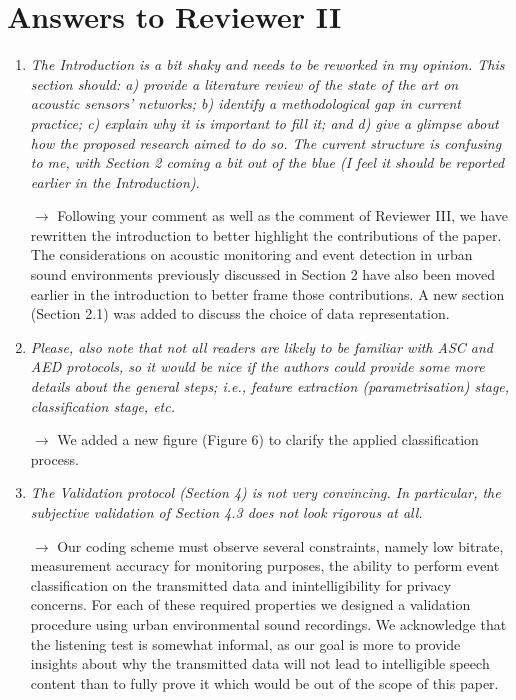 \documentclass[10pt]{article}
\begin{document}
\section{Answers to Reviewer II}

\begin{enumerate}

\item \emph{The Introduction is a bit shaky and needs to be reworked in my opinion. This section should: a) provide a literature review of the state of the art on acoustic sensors’ networks; b) identify a methodological gap in current practice; c) explain why it is important to fill it; and d) give a glimpse about how the proposed research aimed to do so. The current structure is confusing to me, with Section 2 coming a bit out of the blue (I feel it should be reported earlier in the Introduction).}

$\rightarrow$ Following your comment as well as the comment of Reviewer III, we have rewritten the introduction to better highlight the contributions of the paper. The considerations on acoustic monitoring and event detection in urban sound environments previously discussed in Section 2 have also been moved earlier in the introduction to better frame those contributions. A new section (Section 2.1) was added to discuss the choice of data representation.

\item \emph{Please, also note that not all readers are likely to be familiar with ASC and AED protocols, so it would be nice if the authors could provide some more details about the general steps; i.e., feature extraction (parametrisation) stage, classification stage, etc.}

$\rightarrow$ We added a new figure (Figure 6) to clarify the applied classification process.

\item \emph{The Validation protocol (Section 4) is not very convincing. In particular, the subjective validation of Section 4.3 does not look rigorous at all.}

$\rightarrow$ Our coding scheme must observe several constraints, namely low bitrate, measurement accuracy for monitoring purposes, the ability to perform event classification on the transmitted data and inintelligibility for privacy concerns. For each of these required properties we designed a validation procedure using urban environmental sound recordings. We acknowledge that the listening test is somewhat informal, as our goal is more to provide insights about why the transmitted data will not lead to intelligible speech content than to fully prove it which would be out of the scope of this paper.


\end{enumerate}
\end{document}
